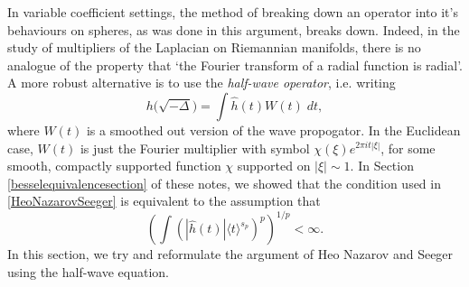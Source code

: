 In variable coefficient settings, the method of breaking down an operator into it's behaviours on spheres, as was done in this argument, breaks down. Indeed, in the study of multipliers of the Laplacian on Riemannian manifolds, there is no analogue of the property that `the Fourier transform of a radial function is radial'. A more robust alternative is to use the \emph{half-wave operator}, i.e. writing
%
\[ h \big( \sqrt{-\Delta} \big) = \int \widehat{h}(t) W(t)\; dt, \]
%
where $W(t)$ is a smoothed out version of the wave propogator. In the Euclidean case, $W(t)$ is just the Fourier multiplier with symbol $\chi(\xi) e^{2 \pi i t |\xi|}$, for some smooth, compactly supported function $\chi$ supported on $|\xi| \sim 1$. In Section \ref{besselequivalencesection} of these notes, we showed that the condition used in \ref{HeoNazarovSeeger} is equivalent to the assumption that
%
\[ \left( \int \left( |\widehat{h}(t)| \langle t \rangle^{s_p} \right)^p \right)^{1/p} < \infty. \]
%
In this section, we try and reformulate the argument of Heo Nazarov and Seeger using the half-wave equation.

